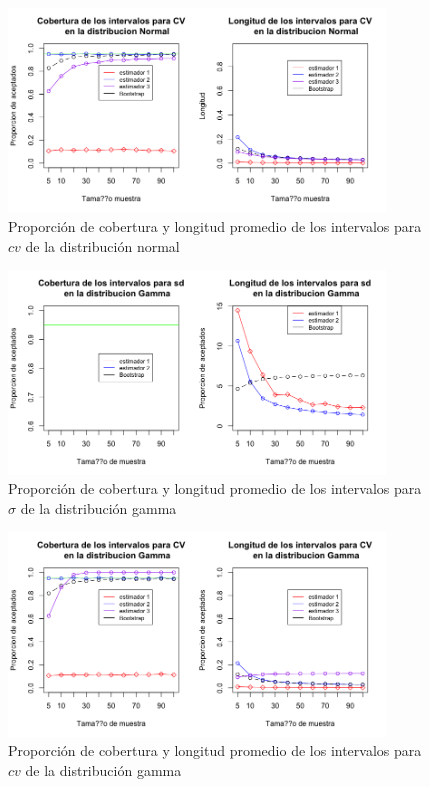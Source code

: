 \documentclass[letterpaper,12pt,onecolumn,titlepage]{article}
\begin{document}
\begin{figure}[!h]
    \begin{center}
        \includegraphics[width=10cm]{Figuras/Rplot01.png}
        \caption{Proporci\'{o}n de cobertura y longitud promedio de los intervalos para $cv$ de la distribuci\'{o}n normal}
        \label{fig:Densidad}
    \end{center}
\end{figure}

\begin{figure}[!h]
    \begin{center}
        \includegraphics[width=10cm]{Figuras/Rplot02.png}
        \caption{Proporci\'{o}n de cobertura y longitud promedio de los intervalos para $\sigma$ de la distribuci\'{o}n gamma}
        \label{fig:Densidad}
    \end{center}
\end{figure}

\begin{figure}[!h]
    \begin{center}
        \includegraphics[width=10cm]{Figuras/Rplot03.png}
        \caption{Proporci\'{o}n de cobertura y longitud promedio de los intervalos para $cv$ de la distribuci\'{o}n gamma}
        \label{fig:Densidad}
    \end{center}
\end{figure}
\end{document}
